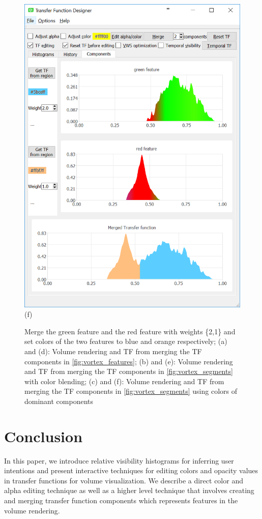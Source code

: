 \documentclass[twoside,twocolumn,10pt]{article}
\begin{document}
\begin{figure}
\begin{minipage}{.16\textwidth}
		\includegraphics[width=1\linewidth]{tf_vortex_merged_segment_green_red}
		(f)
	\end{minipage}
	\caption{Merge the green feature and the red feature with weights \{2,1\} and set colors of the two features to blue and orange respectively; (a) and (d): Volume rendering and TF from merging the TF components in \autoref{fig:vortex_features}; (b) and (e): Volume rendering and TF from merging the TF components in \autoref{fig:vortex_segments} with color blending; (c) and (f): Volume rendering and TF from merging the TF components in \autoref{fig:vortex_segments} using colors of dominant components}
	\label{fig:vortex_merged_2}
\end{figure}

\section{Conclusion}
In this paper, we introduce relative visibility histograms for inferring user intentions and present interactive techniques for editing colors and opacity values in transfer functions for volume visualization. We describe a direct color and alpha editing technique as well as a higher level technique that involves creating and merging transfer function components which represents features in the volume rendering.
\end{document}
